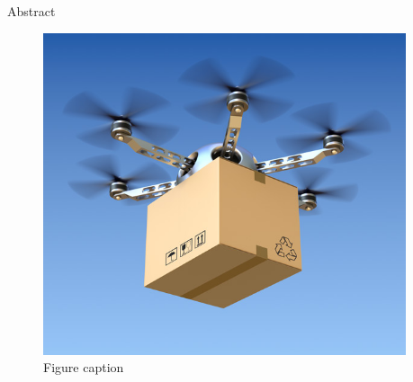 \documentclass[final]{beamer}
\newlength{\sepwid}
\newlength{\onecolwid}
\begin{document}
\setlength{\belowcaptionskip}{2ex} %
\setlength\belowdisplayshortskip{2ex} %



\begin{frame}[t] %

\begin{columns}[t] %

\begin{column}{\sepwid}\end{column} %

\begin{column}{\onecolwid} %


\begin{block}{Abstract}
{\small\par}

\end{block}



\begin{figure}
\includegraphics[width=0.8\linewidth]{images/delivery-drone.jpg}
\caption{Figure caption}
\end{figure}




\end{column}
\end{columns}
\end{frame}
\end{document}
